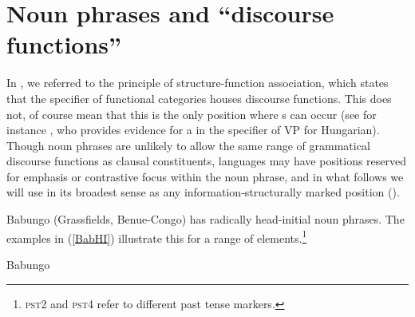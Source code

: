 \documentclass[output=paper,hidelinks]{langscibook}
\begin{document}
\section{Noun phrases and ``discourse functions''}\label{sec:nominal:NPdfs}

In , we referred to the principle of structure-function association, which states that the specifier of functional categories houses discourse functions. This does not, of course mean that this is the only position where {\DF}s can occur (see for instance \cite{Laczko14}, who provides evidence for a {\DF} in the specifier of VP for Hungarian).  Though noun phrases are unlikely to allow the same range of grammatical discourse functions as clausal constituents, languages may have positions reserved for emphasis or contrastive focus within the noun phrase, and in what follows we will use {\DF} in its broadest sense as any information-structurally marked position ().

Babungo (Grassfields, Benue-Congo) has radically head-initial noun phrases. The examples in (\ref{BabHI}) illustrate this for a range of elements.\footnote{\textsc{pst2} and \textsc{pst4} refer to different past tense markers.}


\eal\label{BabHI} Babungo
\zl
\end{document}
